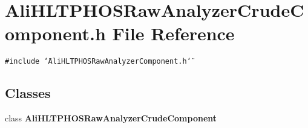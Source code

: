 \section{Ali\-HLTPHOSRaw\-Analyzer\-Crude\-Component.h File Reference}
\label{AliHLTPHOSRawAnalyzerCrudeComponent_8h}
{\tt \#include \char`\"{}Ali\-HLTPHOSRaw\-Analyzer\-Component.h\char`\"{}}\par
\subsection*{Classes}
\begin{CompactItemize}
\item 
class {\bf Ali\-HLTPHOSRaw\-Analyzer\-Crude\-Component}
\end{CompactItemize}
